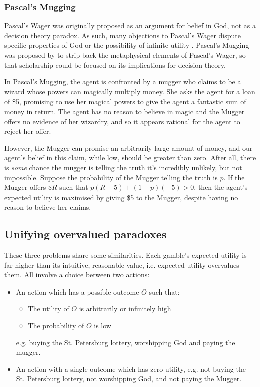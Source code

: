 \documentclass{article}
\begin{document}
\subsubsection {Pascal's Mugging}
Pascal's Wager was originally proposed as an argument for belief in God, not as a decision theory paradox. As such, many objections to Pascal's Wager dispute specific properties of God \citep{mackie1990miracle} or the possibility of infinite utility \citep{mcclennen1994pascal}. Pascal's Mugging was proposed by \citep{bostrom2009pascal} to strip back the metaphysical elements of Pascal's Wager, so that scholarship could be focused on its implications for decision theory.

In Pascal's Mugging, the agent is confronted by a mugger who claims to be a wizard whose powers can magically multiply money. She asks the agent for a loan of \$5, promising to use her magical powers to give the agent a fantastic sum of money in return. The agent has no reason to believe in magic and the Mugger offers no evidence of her wizardry, and so it appears rational for the agent to reject her offer.

However, the Mugger can promise an arbitrarily large amount of money, and our agent's belief in this claim, while low, should be greater than zero. After all, there is \textit{some} chance the mugger is telling the truth \textemdash{} it's incredibly unlikely, but not impossible. Suppose the probability of the Mugger telling the truth is \(p\). If the Mugger offers \$\(R\) such that \(p(R-5)+(1-p)(-5)>0\), then the agent's expected utility is maximised by giving \$5 to the Mugger, despite having no reason to believe her claims.

\subsection{Unifying overvalued paradoxes}
These three problems share some similarities. Each gamble's expected utility is far higher than its intuitive, reasonable value, i.e. expected utility overvalues them. All involve a choice between two actions:

\begin{itemize}
\item An action which has a possible outcome \(O\) such that:
\begin{itemize}
\item The utility of \(O\) is arbitrarily or infinitely high
\item The probability of \(O\) is low
\end{itemize}
e.g. buying the St. Petersburg lottery, worshipping God and paying the mugger.
\item An action with a single outcome which has zero utility, e.g. not buying the St. Petersburg lottery, not worshipping God, and not paying the Mugger.
\end{itemize}
\end{document}
